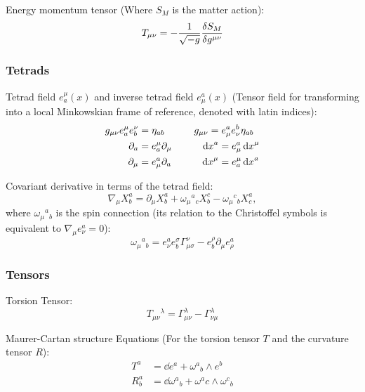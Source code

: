 			\noindent
			Energy momentum tensor (Where $S_M$ is the matter action):
			\begin{equation}
				T_{\mu\nu} = -\frac{1}{\sqrt{-g}} \fdv{S_M}{g^{\mu\nu}}
			\end{equation}


		\subsubsection{Tetrads}
			Tetrad field $e_a^\mu(x)$ and inverse tetrad field $e_\mu^a(x)$ (Tensor field for transforming into a local Minkowskian frame of reference, denoted with latin indices):
			\begin{equation}
				\begin{aligned}
					g_{\mu\nu} e_a^\mu e_b^\nu &= \eta_{ab}
					\hspace{30pt} g_{\mu\nu} = e^a_\mu e^b_\nu \eta_{ab} \\
					\partial_a &= e_a^\mu \partial_\mu
					\hspace{30pt} \dd{x}^a = e^a_\mu \dd{x}^\mu \\
					\partial_\mu &= e_\mu^a \partial_a
					\hspace{30pt} \dd{x}^\mu = e^\mu_a \dd{x}^a
				\end{aligned}
			\end{equation}

			\noindent
			Covariant derivative in terms of the tetrad field:
			\begin{equation}
				\nabla_\mu X^a_b = \partial_\mu X^a_b + \omega_\mu{}^a{}_c X^c_b - \omega_\mu{}^c{}_b X^a_c,
			\end{equation}
			where $\omega_\mu{}^a{}_b$ is the spin connection (its relation to the Christoffel symbols is equivalent to $\nabla_\mu e^a_\nu = 0$):
			\begin{equation}
				\omega_\mu{}^a{}_b = e^a_\nu e^\sigma_b \Gamma^\nu_{\mu\sigma} - e^\rho_b \partial_\mu e^a_\rho
			\end{equation}


		\subsubsection{Tensors}
			Torsion Tensor:
			\begin{equation}
				T_{\mu\nu}{}^\lambda = \Gamma_{\mu\nu}^\lambda - \Gamma_{\nu\mu}^\lambda
			\end{equation}

			\noindent
			Maurer-Cartan structure Equations (For the torsion tensor $T$ and the curvature tensor $R$):
			\begin{equation}
				\begin{aligned}
					T^a &= \dd e^a + \omega^a{}_b \wedge e^b \\
					R^a_b &= \dd \omega^a{}_b + \omega^a_{}c \wedge \omega^c{}_b
				\end{aligned}
			\end{equation}

